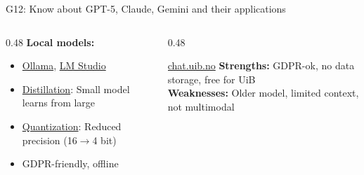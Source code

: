\documentclass[aspectratio=169, 10pt]{beamer}
\begin{document}
\begin{frame}{G12: Know about GPT-5, Claude, Gemini and their applications}
    \vspace{0.1cm}
    \begin{columns}[T]
        \begin{column}{0.48\textwidth}
            \textbf{Local models:}
            \scriptsize
            \begin{itemize}
                \item \href{https://ollama.ai/}{Ollama}, \href{https://lmstudio.ai/}{LM Studio}
                \item \href{https://en.wikipedia.org/wiki/Knowledge_distillation}{Distillation}: Small model learns from large
                \item \href{https://en.wikipedia.org/wiki/Quantization_(signal_processing)\#Neural_network_quantization}{Quantization}: Reduced precision (16$\rightarrow$4 bit)
                \item GDPR-friendly, offline
            \end{itemize}
        \end{column}
        \begin{column}{0.48\textwidth}
            \begin{block}{\scriptsize \href{https://chat.uib.no/}{chat.uib.no}}
                \scriptsize
                \textbf{Strengths:} GDPR-ok, no data storage, free for UiB\\
                \textbf{Weaknesses:} Older model, limited context, not multimodal
            \end{block}
        \end{column}
    \end{columns}
\end{frame}
\end{document}
